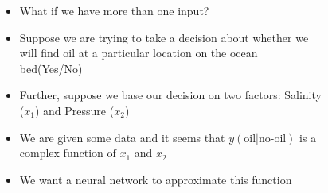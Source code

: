 \begin{frame}
	\begin{columns}
		\begin{overlayarea}{\textwidth}{\textheight}
			\begin{figure}
			\end{figure}
		\end{overlayarea}
		\begin{overlayarea}{\textwidth}{\textheight}
			\begin{itemize}
			\item<1->{ What if we have more than one input?}
			\item<2-> {Suppose we are trying to take a decision about whether we will find oil at a particular location on the ocean bed(Yes/No)}
			\item<3-> {Further, suppose we base our decision on two factors: Salinity ($x_1$) and Pressure ($x_2$)}
			\item<4-> {We are given some data and it seems that $y(\text{oil}|\text{no-oil})$ is a complex function of $x_1$ and $x_2$}
			\item<5-> {We want a neural network to approximate this function}
			\end{itemize}
		\end{overlayarea}
	\end{columns}
\end{frame}

